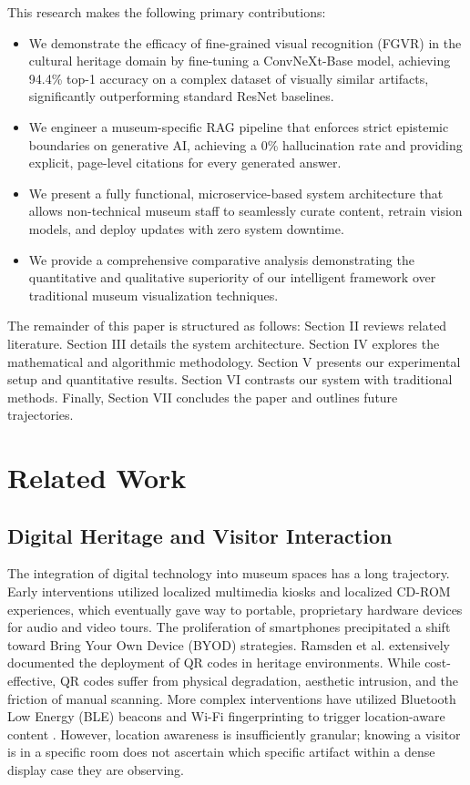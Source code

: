 \documentclass[conference]{IEEEtran}
\begin{document}
This research makes the following primary contributions:
\begin{itemize}
    \item We demonstrate the efficacy of fine-grained visual recognition (FGVR) in the cultural heritage domain by fine-tuning a ConvNeXt-Base model, achieving 94.4\% top-1 accuracy on a complex dataset of visually similar artifacts, significantly outperforming standard ResNet baselines.
    \item We engineer a museum-specific RAG pipeline that enforces strict epistemic boundaries on generative AI, achieving a 0\% hallucination rate and providing explicit, page-level citations for every generated answer.
    \item We present a fully functional, microservice-based system architecture that allows non-technical museum staff to seamlessly curate content, retrain vision models, and deploy updates with zero system downtime.
    \item We provide a comprehensive comparative analysis demonstrating the quantitative and qualitative superiority of our intelligent framework over traditional museum visualization techniques.
\end{itemize}

The remainder of this paper is structured as follows: Section II reviews related literature. Section III details the system architecture. Section IV explores the mathematical and algorithmic methodology. Section V presents our experimental setup and quantitative results. Section VI contrasts our system with traditional methods. Finally, Section VII concludes the paper and outlines future trajectories.

\section{Related Work}

\subsection{Digital Heritage and Visitor Interaction}
The integration of digital technology into museum spaces has a long trajectory. Early interventions utilized localized multimedia kiosks \cite{kiosks2003} and localized CD-ROM experiences, which eventually gave way to portable, proprietary hardware devices for audio and video tours. The proliferation of smartphones precipitated a shift toward Bring Your Own Device (BYOD) strategies. Ramsden et al. \cite{qr2012} extensively documented the deployment of QR codes in heritage environments. While cost-effective, QR codes suffer from physical degradation, aesthetic intrusion, and the friction of manual scanning. More complex interventions have utilized Bluetooth Low Energy (BLE) beacons and Wi-Fi fingerprinting to trigger location-aware content \cite{ble2016}. However, location awareness is insufficiently granular; knowing a visitor is in a specific room does not ascertain which specific artifact within a dense display case they are observing.
\end{document}
